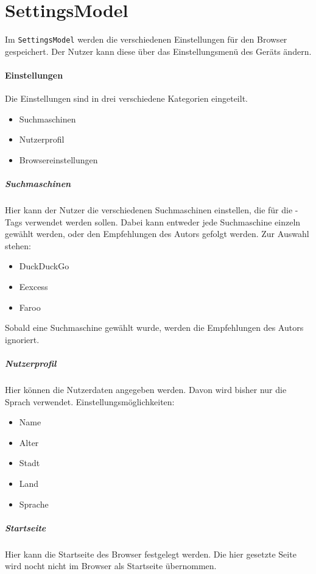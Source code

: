 
\section{SettingsModel}

Im \lstinline|SettingsModel| werden die verschiedenen Einstellungen für den Browser gespeichert.
Der Nutzer kann diese über das Einstellungsmenü des Geräts ändern.

\paragraph{Einstellungen}  

Die Einstellungen sind in drei verschiedene Kategorien eingeteilt.
\begin{itemize}  
     \item Suchmaschinen  
     \item Nutzerprofil
     \item Browsereinstellungen
\end{itemize}

\subparagraph{Suchmaschinen}  

Hier kann der Nutzer die verschiedenen Suchmaschinen einstellen, die für die \SEARCH-Tags verwendet werden sollen.
Dabei kann entweder jede Suchmaschine einzeln gewählt werden, oder den Empfehlungen des Autors gefolgt werden.
Zur Auswahl stehen:
\begin{itemize}  
     \item DuckDuckGo
     \item Eexcess
     \item Faroo  
\end{itemize}
Sobald eine Suchmaschine gewählt wurde, werden die Empfehlungen des Autors ignoriert.

\subparagraph{Nutzerprofil}  

Hier können die Nutzerdaten angegeben werden.
Davon wird bisher nur die Sprach verwendet.
Einstellungsmöglichkeiten:
\begin{itemize}  
     \item Name  
     \item Alter  
     \item Stadt
     \item Land
     \item Sprache
\end{itemize}

\subparagraph{Startseite}  

Hier kann die Startseite des Browser festgelegt werden.
Die hier gesetzte Seite wird nocht nicht im Browser als Startseite übernommen.
